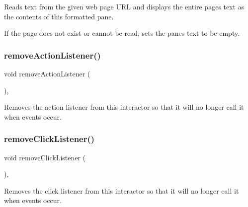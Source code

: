 Reads text from the given web page U\+RL and displays the entire page\textquotesingle{}s text as the contents of this formatted pane. 

If the page does not exist or cannot be read, sets the pane\textquotesingle{}s text to be empty. \mbox{\label{classGInteractor_ab7fe7a876367b87cf7202f947f1d05e4}} 
\subsubsection{\texorpdfstring{remove\+Action\+Listener()}{removeActionListener()}}
{\footnotesize\ttfamily void remove\+Action\+Listener (\begin{DoxyParamCaption}{ }\end{DoxyParamCaption})\hspace{0.3cm}{\ttfamily [virtual]}, {\ttfamily [inherited]}}



Removes the action listener from this interactor so that it will no longer call it when events occur. 

\mbox{\label{classGInteractor_ad39d0325cde6b97ebda4b9d7787c633b}} 
\subsubsection{\texorpdfstring{remove\+Click\+Listener()}{removeClickListener()}}
{\footnotesize\ttfamily void remove\+Click\+Listener (\begin{DoxyParamCaption}{ }\end{DoxyParamCaption})\hspace{0.3cm}{\ttfamily [virtual]}, {\ttfamily [inherited]}}



Removes the click listener from this interactor so that it will no longer call it when events occur. 

\mbox{\label{classGInteractor_aa4250907e4cdd77349c04f0cf5cdd3d3}} 
